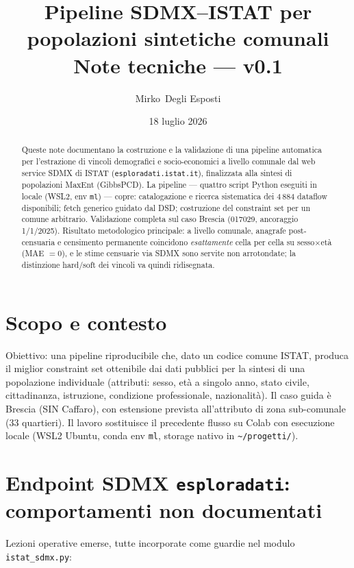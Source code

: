\documentclass[11pt,a4paper]{article}
\title{\textbf{Pipeline SDMX--ISTAT per popolazioni sintetiche comunali}\\[2mm]
\large Note tecniche --- v0.1}
\author{Mirko~Degli Esposti}
\date{18 luglio 2026}
\newcommand{\code}[1]{\texttt{#1}}
\begin{document}
\maketitle

\begin{abstract}
\noindent
Queste note documentano la costruzione e la validazione di una pipeline automatica
per l'estrazione di vincoli demografici e socio-economici a livello comunale dal
web service SDMX di ISTAT (\code{esploradati.istat.it}), finalizzata alla sintesi
di popolazioni MaxEnt (GibbsPCD). La pipeline --- quattro script Python eseguiti
in locale (WSL2, env \code{ml}) --- copre: catalogazione e ricerca sistematica dei
4\,884 dataflow disponibili; fetch generico guidato dal DSD; costruzione del
constraint set per un comune arbitrario. Validazione completa sul caso Brescia
(017029, ancoraggio 1/1/2025). Risultato metodologico principale: a livello
comunale, anagrafe post-censuaria e censimento permanente coincidono
\emph{esattamente} cella per cella su sesso$\times$et\`a (MAE $=0$), e le stime
censuarie via SDMX sono servite non arrotondate; la distinzione hard/soft dei
vincoli va quindi ridisegnata.
\end{abstract}

\tableofcontents

\section{Scopo e contesto}
Obiettivo: una pipeline riproducibile che, dato un codice comune ISTAT, produca il
miglior constraint set ottenibile dai dati pubblici per la sintesi di una
popolazione individuale (attributi: sesso, et\`a a singolo anno, stato civile,
cittadinanza, istruzione, condizione professionale, nazionalit\`a). Il caso guida
\`e Brescia (SIN Caffaro), con estensione prevista all'attributo di zona
sub-comunale (33 quartieri). Il lavoro sostituisce il precedente flusso su Colab
con esecuzione locale (WSL2 Ubuntu, conda env \code{ml}, storage nativo in
\code{\textasciitilde/progetti/}).

\section{Endpoint SDMX \code{esploradati}: comportamenti non documentati}
\label{sec:quirks}
Lezioni operative emerse, tutte incorporate come guardie nel modulo
\code{istat\_sdmx.py}:
\end{document}
